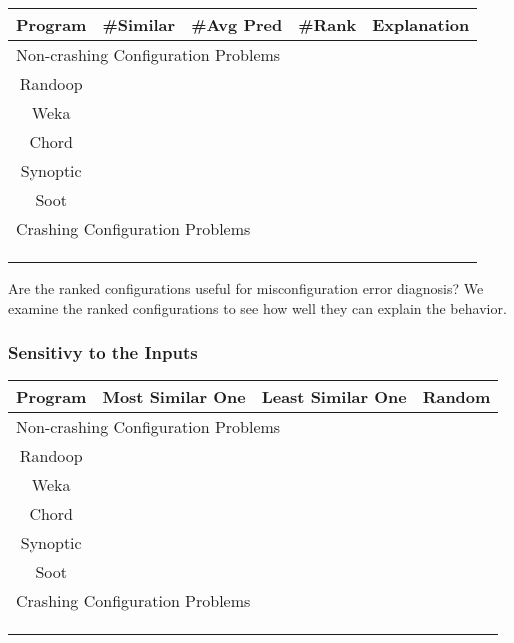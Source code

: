 \begin{table}[t]
\setlength{\tabcolsep}{.84\tabcolsep}
\begin{tabular}{|c|c|c|c|c|}
\hline
 Program & \#Similar & \#Avg Pred & \#Rank & Explanation \\
 \hline
\hline
\multicolumn{5}{|l|}{Non-crashing Configuration Problems}   \\
 \hline
 Randoop & &  &&  \\
\hline
 Weka &  & & & \\
\hline
 Chord & & & &\\
\hline
 Synoptic & & && \\
\hline
 Soot &  &    &&\\
\hline
\hline
\multicolumn{5}{|l|}{Crashing Configuration Problems}   \\
\hline
& & & &\\
\hline
& & & &\\
\hline
& & & &\\
\hline
\end{tabular}

\end{table}

Are the ranked configurations useful for misconfiguration error diagnosis?
We examine the ranked configurations to see how well they can explain the behavior.

\subsubsection{Sensitivy to the Inputs}

\begin{table}[t]
\setlength{\tabcolsep}{.84\tabcolsep}
\begin{tabular}{|c|c|c|c|}
\hline
 Program & Most Similar One& Least Similar One& Random \\
 \hline
\hline
\multicolumn{4}{|l|}{Non-crashing Configuration Problems}   \\
 \hline
 Randoop & & &   \\
\hline
 Weka &  & & \\
\hline
 Chord & & & \\
\hline
 Synoptic & & &  \\
\hline
 Soot &  &  &  \\
\hline
\hline
\multicolumn{4}{|l|}{Crashing Configuration Problems}   \\
\hline
& & & \\
\hline
& & & \\
\hline
& & & \\
\hline
\end{tabular}

\end{table}

